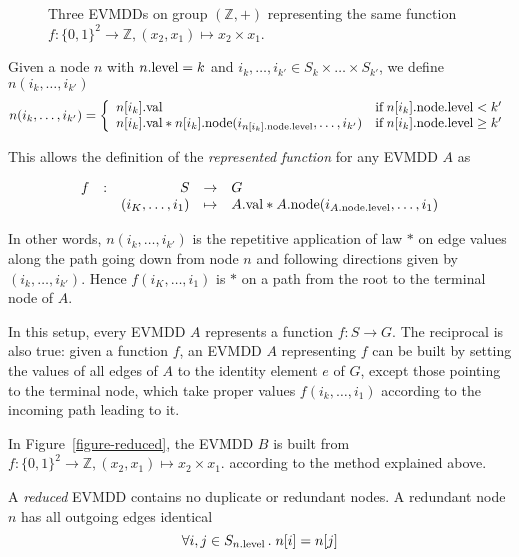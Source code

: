 \documentclass[a4paper,oneside,11pt,pdftex]{llncs}
\newcommand{\Z}{\mathbb{Z}}
\newcommand{\m}{\mbox}
\newcommand{\val}[1]{#1{\rm .val}}
\newcommand{\node}[1]{#1{\rm .node}}
\newcommand{\level}[1]{#1{\rm .level}}
\begin{document}
\begin{figure}[htbp]
  \centering
    
  \caption{Three EVMDDs on group $(\Z, +)$ representing the same function $f:\{0, 1\}^2\rightarrow\Z, (x_2, x_1)\mapsto x_2\times x_1$.}
\label{figure-reduced}
\end{figure}

\begin{definition}
Given a node $n$ with $\level{n} = k$ and $i_k,\ldots, i_{k'} \in S_k \times \ldots \times S_{k'}$, we define $n(i_k, \ldots, i_{k'})$
$$
n(i_k,\ldots, i_{k'}) = \left\{
  \begin{array}{ll}
    \val{n[i_k]}&\m{if}\;\level{\node{n[i_k]}} < k'\\
    \val{n[i_k]} * \node{n[i_k]}(i_{\level{\node{n[i_k]}}},\ldots, i_{k'})&\m{if}\;\level{\node{n[i_k]}} \geq k'
  \end{array}
\right.
$$
\end{definition}

This allows the definition of the \emph{represented function} for any EVMDD $A$ as

$$
\begin{array}{lcrcl}
  f&:&S&\rightarrow&G\\
   & &(i_K,\ldots, i_1)&\mapsto&\val{A} * \node{A}(i_{\level{\node{A}}},\ldots, i_1)
\end{array}
$$

In other words, $n(i_k,\ldots, i_{k'})$ is the repetitive application of law $*$
on edge values along the path going down from node $n$ and following directions
given by $(i_k,\ldots, i_{k'})$. Hence $f(i_K,\ldots, i_1)$ is $*$ on a path from
the root to the terminal node of $A$.

In this setup, every EVMDD $A$ represents a function $f:S\rightarrow G$.
The reciprocal is also true: given a function $f$, an EVMDD $A$ representing
$f$ can be built by setting the values of all edges of $A$ to the identity element $e$
of $G$, except those pointing to the terminal node, which take proper values
$f(i_k,\ldots, i_1)$ according to the incoming path leading to it.

\begin{example}
In Figure~\vref{figure-reduced}, the EVMDD $B$ is built
from $f:\{0, 1\}^2\rightarrow\Z, (x_2, x_1)\mapsto x_2\times x_1$. according to the method explained above.
\end{example}

\begin{definition}\label{definition-reduced}
A \emph{reduced} EVMDD contains no duplicate or redundant nodes.
A redundant node $n$ has all outgoing edges identical
$$
\forall i, j \in S_{\level{n}}\,.\; n[i] = n[j]
$$
\end{definition}
\end{document}
